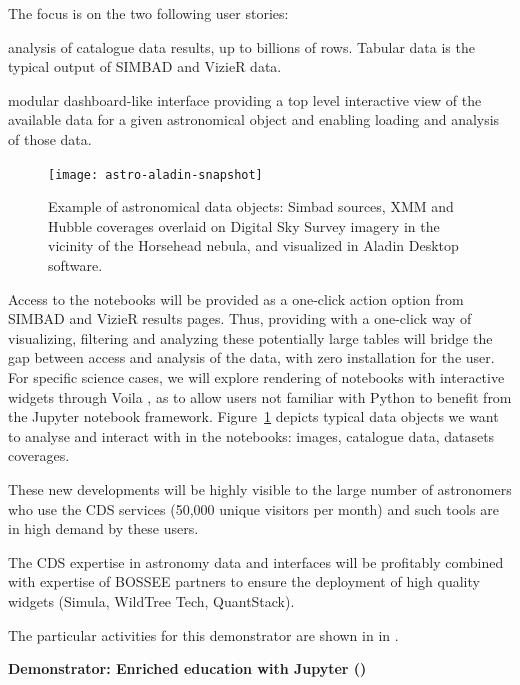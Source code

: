   The focus is on the two following user stories:
    \begin{compactitem}
        \item analysis of catalogue data results, up to billions of rows.
              Tabular data is the typical output of SIMBAD and VizieR data.
        \item modular dashboard-like interface providing a top level
              interactive view of the available data for a given astronomical
              object and enabling loading and analysis of those data.
    \end{compactitem}


\begin{figure}[ht!]\centering
  \texttt{[image: astro-aladin-snapshot]}
  \caption{Example of astronomical data objects: Simbad sources, XMM and Hubble coverages overlaid on Digital Sky Survey imagery in the vicinity of the Horsehead nebula, and visualized in Aladin Desktop software.}\label{fig:astro-aladin-snapshot}
\end{figure}

  Access to the notebooks will be provided as a one-click action option from
  SIMBAD and VizieR results pages.
  Thus, providing with a one-click way of visualizing, filtering and analyzing
these potentially large tables will bridge the gap between access and analysis
of the data, with zero installation for the user.
  For specific science cases, we will explore rendering of notebooks with
  interactive widgets through Voila \cite{Voila}, as to allow users not familiar with
  Python to benefit from the Jupyter notebook framework.
  Figure~\ref{fig:astro-aladin-snapshot} depicts typical data objects we want to analyse and interact with in the notebooks: images, catalogue data, datasets coverages.

  These new developments will be highly visible to the large number of astronomers who use the CDS services (50,000 unique visitors per month) and such tools are in high demand by these users.

  The CDS expertise in astronomy data and interfaces will be profitably combined with expertise of BOSSEE partners to ensure the deployment of high quality widgets (Simula, WildTree Tech, QuantStack).

  The particular activities for this demonstrator are shown in
   in .

\medskip
\noindent\textbf{Demonstrator: Enriched education with Jupyter ()}\label{sec:concept-demonstrator-teaching}

